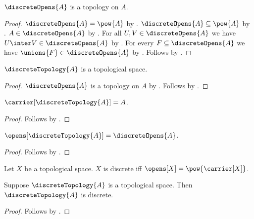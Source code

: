 \begin{theorem}\label{discrete_opens_form_topology}
    $\discreteOpens{A}$ is a topology on $A$.
\end{theorem}
\begin{proof}
    $\discreteOpens{A}=\pow{A}$ by .
    $\discreteOpens{A}\subseteq\pow{A}$ by .
    $A\in\discreteOpens{A}$ by .
    For all $U,V\in\discreteOpens{A}$ we have
        $U\inter V\in\discreteOpens{A}$ by .
    For every $F\subseteq\discreteOpens{A}$ we have
        $\unions{F}\in\discreteOpens{A}$
        by .
    Follows by .
\end{proof}

\begin{theorem}\label{discrete_topology_is_topological_space}
    $\discreteTopology{A}$ is a topological space.
\end{theorem}
\begin{proof}
    $\discreteOpens{A}$ is a topology on $A$
        by .
    Follows by
        .
\end{proof}

\begin{proposition}\label{discrete_topology_carrier}
    $\carrier[\discreteTopology{A}]=A$.
\end{proposition}
\begin{proof}
    Follows by
        .
\end{proof}

\begin{proposition}\label{discrete_topology_opens}
    $\opens[\discreteTopology{A}]=\discreteOpens{A}$.
\end{proposition}
\begin{proof}
    Follows by
        .
\end{proof}

\begin{definition}\label{is_discrete}
    Let $X$ be a topological space.
    $X$ is discrete iff $\opens[X]=\pow{\carrier[X]}$.
\end{definition}

\begin{proposition}\label{discrete_topology_is_discrete}
    Suppose $\discreteTopology{A}$ is a topological space.
    Then $\discreteTopology{A}$ is discrete.
\end{proposition}
\begin{proof}
    Follows by
        .
\end{proof}

